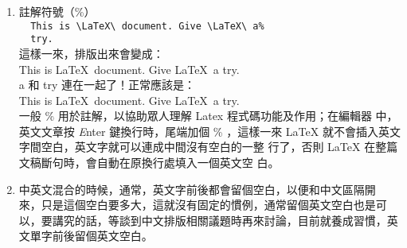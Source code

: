 \documentclass[12pt, a4paper]{report}
\begin{document}
\begin{enumerate}
              \\
            \verb+  This is my first \LaTeX{} typesetting example.+ 
              \\
            \verb+  This is my first \LaTeX\ typesetting example.+ 
              \\
          所以，正常印出來應該是：\\
            This is my first \LaTeX\ typesetting example.
        \item 註解符號（\%）\\
            \verb+  This is \LaTeX\ document. Give \LaTeX\ a%+ \\
            \verb+  try.+ \\
          這樣一來，排版出來會變成：\\
            This is \LaTeX\ document. Give \LaTeX\ a%
            try. \\
          \hypertarget{whitespace}{a 和 try} 連在一起了！正常應該是：\\
            This is \LaTeX\ document. Give \LaTeX\ a try. \\
          一般 \% 用於註解，以協助眾人理解 Latex 程式碼功能及作用；在編輯器
            中，英文文章按 {\emph Enter} 鍵換行時，尾端加個 \% ，這樣一來 
            LaTeX 就不會插入英文字間空白，英文字就可以連成中間沒有空白的一整
            行了，否則 LaTeX 在整篇文稿斷句時，會自動在原換行處填入一個英文空
            白。
        \item 中英文混合的時候，通常，英文字前後都會留個空白，以便和中文區隔開
          來，只是這個空白要多大，這就沒有固定的慣例，通常留個英文空白也是可
          以，要講究的話，等談到中文排版相關議題時再來討論，目前就養成習慣，英
          文單字前後留個英文空白。
      \end{enumerate}
\end{document}
